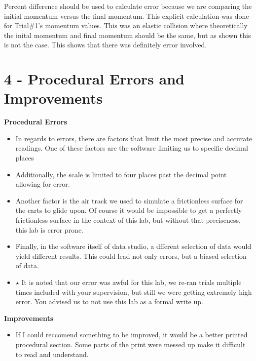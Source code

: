 \documentclass{report}
\begin{document}
\noindent Percent difference should be used to calculate error because we are comparing the 
initial momentum versus the final momentum. This explicit calculation was done for Trial\#1's
momentum values. This was an elastic collision where theoretically the inital momentum and
final momentum should be the same, but as shown this is not the case. This shows that there was
definitely error involved.

\newpage

\section*{4 - Procedural Errors and Improvements}

\noindent \textbf{Procedural Errors}
\begin{itemize}
  \item In regards to errors, there are factors that limit the most precise and 
        accurate readings. One of these factors are the software limiting us to 
        specific decimal places
  \item Additionally, the scale is limited to four places past the decimal point
        allowing for error.
  \item Another factor is the air track we used to simulate a frictionless surface
        for the carts to glide upon. Of course it would be impossible to get a 
        perfectly frictionless surface in the context of this lab, but without that
        preciseness, this lab is error prone.
  \item Finally, in the software itself of data studio, a dfferent selection of 
        data would yield different results. This could lead not only errors, but
        a biased selection of data.
  \item$\star$ It is noted that our error was awful for this lab, we re-ran trials 
               multiple times included with your supervision, but still we were 
               getting extremely high error. You advised us to not use this lab
               as a formal write up.
\end{itemize}

\noindent \textbf{Improvements}
\begin{itemize}
  \item If I could reccomend something to be improved, it would be a better printed
        procedural section. Some parts of the print were messed up make it difficult
        to read and understand.
\end{itemize}
\end{document}
